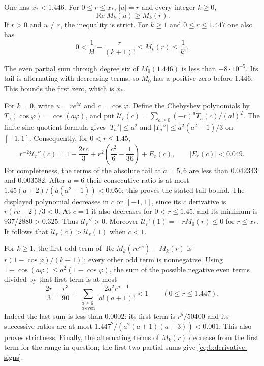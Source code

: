 \begin{lmm}\label{lmm:b:angular}
One has $x_*<1.446$. For $0\leq r\leq x_*$, $|u|=r$ and
every integer $k\geq0$,
\begin{equation}\label{eq:b:angular}
 \operatorname{Re}M_k(u)\geq M_k(r).
\end{equation}
If $r>0$ and $u\ne r$, the inequality is strict. For $k\geq1$
and $0\leq r\leq1.447$ one also has
\begin{equation}\label{eq:b:derivative-signs}
 0<\frac1{k!}-\frac r{(k+1)!}
                  \leq M_k(r)\leq\frac1{k!}.
\end{equation}
\end{lmm}
\begin{prf}
The even partial sum through degree six of $M_0(1.446)$ is less
than $-8\cdot10^{-5}$. Its tail is alternating with decreasing
terms, so $M_0$ has a positive zero before $1.446$. This bounds
the first zero, which is $x_*$.

For $k=0$, write $u=re^{i\varphi}$ and $c=\cos\varphi$.
Define the Chebyshev polynomials by
$T_a(\cos\varphi)=\cos(a\varphi)$, and put
$\mathcal U_r(c)=\sum_{a\geq0}(-r)^aT_a(c)/(a!)^2$.
The finite sine-quotient formula gives
$|T_a'|\leq a^2$ and
$|T_a''|\leq a^2(a^2-1)/3$ on $[-1,1]$.
Consequently, for $0<r\leq1.45$,
\[
 r^{-2}\mathcal U_r''(c)
 =1-\frac{2r c}{3}
       +r^2\left(\frac{c^2}{6}-\frac1{36}\right)+E_r(c),
 \qquad |E_r(c)|<0.049.
\]
For completeness, the terms of the absolute tail at $a=5,6$ are
less than $0.042343$ and $0.003582$. After $a=6$ their consecutive
ratio is at most
$1.45(a+2)/(a(a^2-1))<0.056$; this proves the stated tail bound.
The displayed polynomial decreases in $c$ on $[-1,1]$, since
its $c$ derivative is $r(rc-2)/3<0$. At $c=1$ it also decreases for
$0<r\leq1.45$, and its minimum is $937/2880>0.325$.
Thus $\mathcal U_r''>0$. Moreover
$\mathcal U_r'(1)=-rM_0(r)\leq0$ for $r\leq x_*$.
It follows that $\mathcal U_r(c)>\mathcal U_r(1)$ when $c<1$.

For $k\geq1$, the first odd term of
$\operatorname{Re}M_k(re^{i\varphi})-M_k(r)$ is
$r(1-\cos\varphi)/(k+1)!$; every other odd term is nonnegative.
Using $1-\cos(a\varphi)\leq a^2(1-\cos\varphi)$, the sum of the
possible negative even terms divided by that first term is at most
\[
 \frac{2r}{3}+\frac{r^3}{90}
       +\sum_{\substack{a\geq6\\a\ \text{even}}}
                         \frac{2a^2r^{a-1}}{a!(a+1)!}<1
                       \qquad(0\leq r\leq1.447).
\]
Indeed the last sum is less than $0.0002$: its first term is
$r^5/50400$ and its successive ratios are at most
$1.447^2/(a^2(a+1)(a+3))<0.001$.
This also proves strictness. Finally, the alternating terms of
$M_k(r)$ decrease from the first term for the range in question;
the first two partial sums give \eqref{eq:b:derivative-signs}.
\end{prf}


